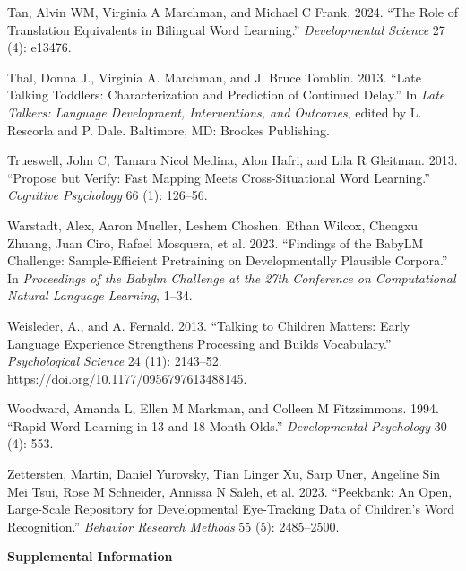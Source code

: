 \documentclass[
  11pt,
]{article}
\newlength{\cslhangindent}
\newenvironment{CSLReferences}[2] %
 {\begin{list}{}{%
  \setlength{\itemindent}{0pt}
  \setlength{\leftmargin}{0pt}
  \setlength{\parsep}{0pt}
  \ifodd #1
   \setlength{\leftmargin}{\cslhangindent}
   \setlength{\itemindent}{-1\cslhangindent}
  \fi
  \setlength{\itemsep}{#2\baselineskip}}}
 {\end{list}}
\begin{document}
\begin{CSLReferences}{1}{0}
Tan, Alvin WM, Virginia A Marchman, and Michael C Frank. 2024. {``The
Role of Translation Equivalents in Bilingual Word Learning.''}
\emph{Developmental Science} 27 (4): e13476.

Thal, Donna J., Virginia A. Marchman, and J. Bruce Tomblin. 2013.
{``Late Talking Toddlers: Characterization and Prediction of Continued
Delay.''} In \emph{Late Talkers: Language Development, Interventions,
and Outcomes}, edited by L. Rescorla and P. Dale. Baltimore, MD: Brookes
Publishing.

Trueswell, John C, Tamara Nicol Medina, Alon Hafri, and Lila R Gleitman.
2013. {``Propose but Verify: Fast Mapping Meets Cross-Situational Word
Learning.''} \emph{Cognitive Psychology} 66 (1): 126--56.

Warstadt, Alex, Aaron Mueller, Leshem Choshen, Ethan Wilcox, Chengxu
Zhuang, Juan Ciro, Rafael Mosquera, et al. 2023. {``Findings of the
BabyLM Challenge: Sample-Efficient Pretraining on Developmentally
Plausible Corpora.''} In \emph{Proceedings of the Babylm Challenge at
the 27th Conference on Computational Natural Language Learning}, 1--34.

Weisleder, A., and A. Fernald. 2013. {``Talking to Children Matters:
Early Language Experience Strengthens Processing and Builds
Vocabulary.''} \emph{Psychological Science} 24 (11): 2143--52.
\url{https://doi.org/10.1177/0956797613488145}.

Woodward, Amanda L, Ellen M Markman, and Colleen M Fitzsimmons. 1994.
{``Rapid Word Learning in 13-and 18-Month-Olds.''} \emph{Developmental
Psychology} 30 (4): 553.

Zettersten, Martin, Daniel Yurovsky, Tian Linger Xu, Sarp Uner, Angeline
Sin Mei Tsui, Rose M Schneider, Annissa N Saleh, et al. 2023.
{``Peekbank: An Open, Large-Scale Repository for Developmental
Eye-Tracking Data of Children's Word Recognition.''} \emph{Behavior
Research Methods} 55 (5): 2485--2500.

\end{CSLReferences}

\newpage
\begin{center}
{\LARGE\bfseries Supplemental Information}
\end{center}
\end{document}
